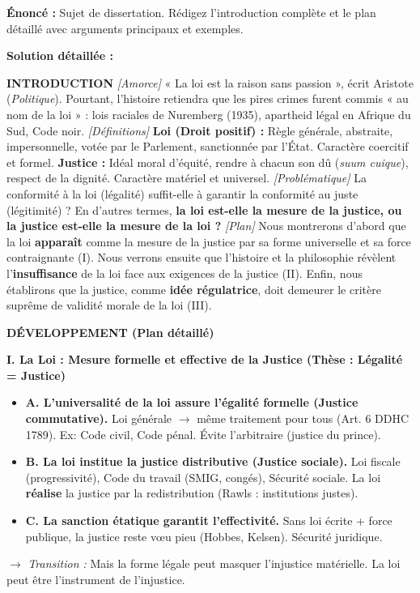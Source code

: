 \documentclass[11pt]{article}
\newcommand{\cle}[1]{{\popxbold\color{popdark}#1}}
\begin{document}
\begin{exoresolu}
\textbf{Énoncé :} Sujet de dissertation. Rédigez l'introduction complète et le plan détaillé avec arguments principaux et exemples.

\tcblower
\textbf{Solution détaillée :}

\textbf{INTRODUCTION}
\textit{[Amorce]} « La loi est la raison sans passion », écrit Aristote (\textit{Politique}). Pourtant, l'histoire retiendra que les pires crimes furent commis « au nom de la loi » : lois raciales de Nuremberg (1935), apartheid légal en Afrique du Sud, Code noir.
\textit{[Définitions]} \textbf{Loi (Droit positif) :} Règle générale, abstraite, impersonnelle, votée par le Parlement, sanctionnée par l'État. Caractère \cle{coercitif} et \cle{formel}. \textbf{Justice :} Idéal moral d'équité, rendre à chacun son dû (\textit{suum cuique}), respect de la dignité. Caractère \cle{matériel} et \cle{universel}.
\textit{[Problématique]} La conformité à la loi (légalité) suffit-elle à garantir la conformité au juste (légitimité) ? En d'autres termes, \textbf{la loi est-elle la mesure de la justice, ou la justice est-elle la mesure de la loi ?}
\textit{[Plan]} Nous montrerons d'abord que la loi \textbf{apparaît} comme la mesure de la justice par sa forme universelle et sa force contraignante (I). Nous verrons ensuite que l'histoire et la philosophie révèlent l'\textbf{insuffisance} de la loi face aux exigences de la justice (II). Enfin, nous établirons que la justice, comme \textbf{idée régulatrice}, doit demeurer le critère suprême de validité morale de la loi (III).

\textbf{DÉVELOPPEMENT (Plan détaillé)}

\textbf{I. La Loi : Mesure formelle et effective de la Justice (Thèse : Légalité = Justice)}
\begin{itemize}
    \item \textbf{A. L'universalité de la loi assure l'égalité formelle (Justice commutative).} Loi générale $\rightarrow$ même traitement pour tous (Art. 6 DDHC 1789). Ex: Code civil, Code pénal. Évite l'arbitraire (justice du prince).
    \item \textbf{B. La loi institue la justice distributive (Justice sociale).} Loi fiscale (progressivité), Code du travail (SMIG, congés), Sécurité sociale. La loi \textbf{réalise} la justice par la redistribution (Rawls : institutions justes).
    \item \textbf{C. La sanction étatique garantit l'effectivité.} Sans loi écrite + force publique, la justice reste vœu pieu (Hobbes, Kelsen). \cle{Sécurité juridique}.
\end{itemize}
$\rightarrow$ \textit{Transition :} Mais la forme légale peut masquer l'injustice matérielle. La loi peut être l'instrument de l'injustice.


\end{exoresolu}
\end{document}
